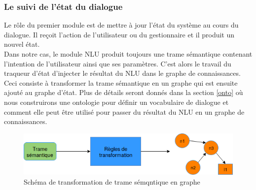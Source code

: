 \subsubsection{Le suivi de l'état du dialogue}
Le rôle du premier module est de mettre à jour l'état du système au cours du dialogue. Il reçoit l'action de l'utilisateur ou du gestionnaire et il produit un nouvel état.\\
Dans notre cas, le module NLU produit toujours une trame sémantique contenant l'intention de l'utilisateur ainsi que ses paramètres. C'est alors le travail du traqueur d'état d'injecter le résultat du NLU dans le graphe de connaissances. Ceci consiste à transformer la trame sémantique en un graphe qui est ensuite ajouté au graphe d'état. Plus de détails seront donnés dans la section \ref{onto} où nous construirons une ontologie pour définir un vocabulaire de dialogue et comment elle peut être utilisé pour passer du résultat du NLU en un graphe de connaissances.
\begin{figure}[H] 
	
	\centering
	\includegraphics[width=0.6\linewidth]{images/Conception/DM/Transformer.png}
	\caption{Schéma de transformation de trame sémqntique en graphe}
\end{figure}\label{transformer}
